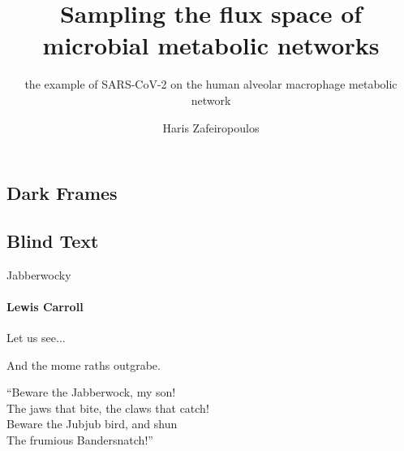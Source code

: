 \documentclass{beamer}
\title{Sampling the flux space of microbial metabolic networks
} %
\subtitle{the example of SARS-CoV-2 on the human alveolar macrophage metabolic network} %
\author{Haris Zafeiropoulos}
\begin{document}
   \shorthandoff{-}
   \frame[c]{\maketitle}


   \begin{darkframes}
      \section{Dark Frames}
      \subsection{Blind Text}

      \begin{frame}{Jabberwocky}
         
         \framesubtitle{Lewis Carroll}%


         Let us see... 

         And the mome raths outgrabe.\\\bigskip

         “Beware the Jabberwock, my son!\\
         The jaws that bite, the claws that catch!\\
         Beware the Jubjub bird, and shun\\
         The frumious Bandersnatch!”\\
      \end{frame}

   \end{darkframes}
   
\end{document}
